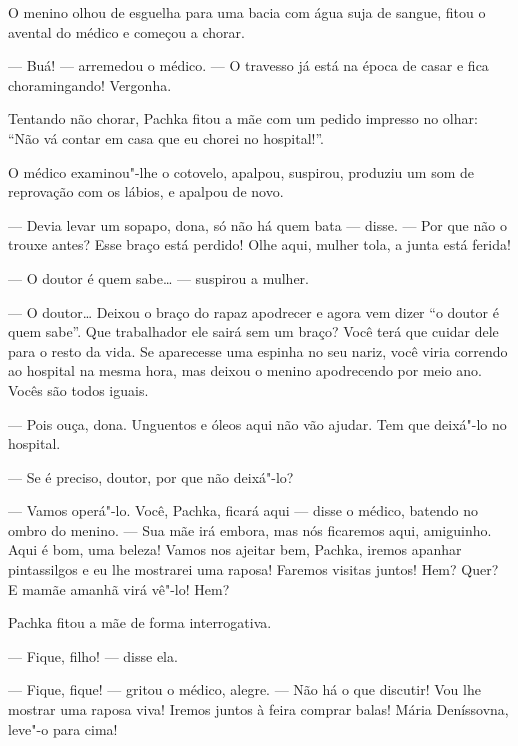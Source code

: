 O menino olhou de esguelha para uma bacia com água suja de sangue, fitou o
avental do médico e começou a chorar.

--- Buá! --- arremedou o médico. --- O travesso já está na época de
casar e fica choramingando! Vergonha.

Tentando não chorar, Pachka fitou a mãe com um pedido impresso no olhar:
``Não vá contar em casa que eu chorei no hospital!''.

O médico examinou"-lhe o cotovelo, apalpou, suspirou, produziu um som de reprovação com os lábios, e apalpou de novo.

--- Devia levar um sopapo, dona, só não há quem bata --- disse. --- Por
que não o trouxe antes? Esse braço está perdido! Olhe aqui, mulher tola,
a junta está ferida!

--- O doutor é quem sabe\ldots{} --- suspirou a mulher.

--- O doutor\ldots{} Deixou o braço do rapaz apodrecer e agora vem dizer ``o
doutor é quem sabe''. Que trabalhador ele sairá sem um braço? Você terá
que cuidar dele para o resto da vida. Se aparecesse uma espinha no seu
nariz, você viria correndo ao hospital na mesma hora, mas deixou o
menino apodrecendo por meio ano. Vocês são todos iguais.


--- Pois ouça, dona. Unguentos e óleos aqui não vão ajudar. Tem que
deixá"-lo no hospital.

--- Se é preciso, doutor, por que não deixá"-lo?

--- Vamos operá"-lo. Você, Pachka, ficará aqui --- disse o médico,
batendo no ombro do menino. --- Sua mãe irá embora, mas nós ficaremos
aqui, amiguinho. Aqui é bom, uma beleza! Vamos nos ajeitar bem, Pachka,
iremos apanhar pintassilgos e eu lhe mostrarei uma raposa! Faremos
visitas juntos! Hem? Quer? E mamãe amanhã virá vê"-lo! Hem?

Pachka fitou a mãe de forma interrogativa.

--- Fique, filho! --- disse ela.

--- Fique, fique! --- gritou o médico, alegre. --- Não há o que
discutir! Vou lhe mostrar uma raposa viva! Iremos juntos à feira comprar
balas! Mária Deníssovna, leve"-o para cima!

